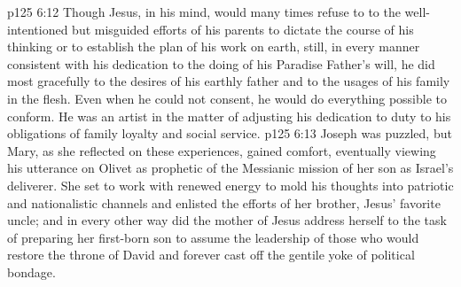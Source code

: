 \pc \vs p125 6:12 Though Jesus, in his mind, would many times refuse to  to the well\hyp{}intentioned but misguided efforts of his parents to dictate the course of his thinking or to establish the plan of his work on earth, still, in every manner consistent with his dedication to the doing of his Paradise Father’s will, he did most gracefully  to the desires of his earthly father and to the usages of his family in the flesh. Even when he could not consent, he would do everything possible to conform. He was an artist in the matter of adjusting his dedication to duty to his obligations of family loyalty and social service.\plusone
\pc \vs p125 6:13 Joseph was puzzled, but Mary, as she reflected on these experiences, gained comfort, eventually viewing his utterance on Olivet as prophetic of the Messianic mission of her son as Israel’s deliverer. She set to work with renewed energy to mold his thoughts into patriotic and nationalistic channels and enlisted the efforts of her brother, Jesus’ favorite uncle; and in every other way did the mother of Jesus address herself to the task of preparing her first\hyp{}born son to assume the leadership of those who would restore the throne of David and forever cast off the gentile yoke of political bondage.
